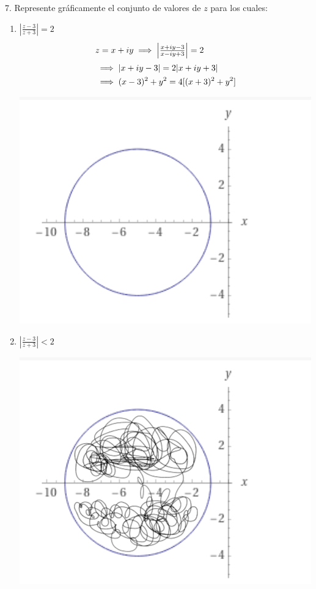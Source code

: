 \documentclass[a4paper,12pt]{article}
\begin{document}
7. Represente gráficamente el conjunto de valores de $z$ para los cuales:
\begin{enumerate}
    \item $\left|\frac{z-3}{z+3}\right|=2$
    \begin{align}
        \intertext{$z=x+iy\implies \left|\frac{x+iy-3}{x-iy+3}\right|=2$}
        &\implies |x+iy-3|=2|x+iy+3|\\
        &\implies (x-3)^2+y^2= 4[(x+3)^2+y^2]
    \end{align}
    \begin{center}
        \includegraphics[scale=0.5]{1.png}
    \end{center}
   
    
    \item $\left|\frac{z-3}{z+3}\right|<2$\newline 
    \begin{center}
        \includegraphics[scale=0.5]{2.png}
    \end{center}
    
    
\end{enumerate}
\end{document}
